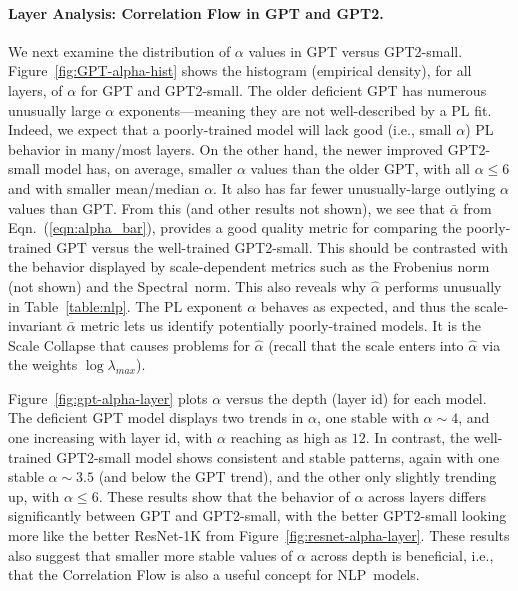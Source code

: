 \paragraph{Layer Analysis: Correlation Flow in GPT and GPT2.} 

We next examine the distribution of $\alpha$ values in GPT versus GPT2-small.
Figure~\ref{fig:GPT-alpha-hist} shows the histogram (empirical density), for all layers, of $\alpha$ for GPT and GPT2-small.  
The older deficient GPT has numerous unusually large $\alpha$ exponents---meaning they are not well-described by a PL fit.
Indeed, we expect that a poorly-trained model will lack good (i.e., small $\alpha$) PL behavior in many/most layers.
On the other hand, the newer improved GPT2-small model has, on average, smaller $\alpha$ values than the older GPT, with all $\alpha\le6$ and with smaller mean/median $\alpha$.
It also has far fewer unusually-large outlying $\alpha$ values than GPT.
From this (and other results not shown), we see that $\bar{\alpha}$ 
from Eqn.~(\ref{eqn:alpha_bar}),
provides a good quality metric for comparing the poorly-trained GPT versus the well-trained GPT2-small.
This should be contrasted with the behavior displayed by scale-dependent metrics such as the Frobenius norm (not shown) and the Spectral~norm.
This also reveals why $\hat{\alpha}$ performs unusually in Table~\ref{table:nlp}.
The PL exponent $\alpha$ behaves as expected, and thus the scale-invariant $\bar{\alpha}$ metric lets us identify potentially poorly-trained models.
It is the Scale Collapse that causes problems for $\hat{\alpha}$ (recall that the scale enters into $\hat{\alpha}$ via the weights $\log\lambda_{max}$).

Figure~\ref{fig:gpt-alpha-layer} plots $\alpha$ versus the depth (layer id) for each model.
The deficient GPT model displays two trends in $\alpha$, one stable with $\alpha\sim 4$, and one increasing with layer id, with $\alpha$ reaching as high as $12$.
In contrast, the well-trained GPT2-small model shows consistent and stable patterns, again with one stable $\alpha\sim 3.5$ (and below the GPT trend), and the other only slightly trending up, with $\alpha\le 6$. 
These results show that the behavior of $\alpha$ across layers differs significantly between GPT and GPT2-small, with the better GPT2-small looking more like the better ResNet-1K from Figure~\ref{fig:resnet-alpha-layer}.
These results also suggest that smaller more stable values of $\alpha$ across depth is beneficial, i.e., that the Correlation Flow is also a useful concept for NLP~models.


